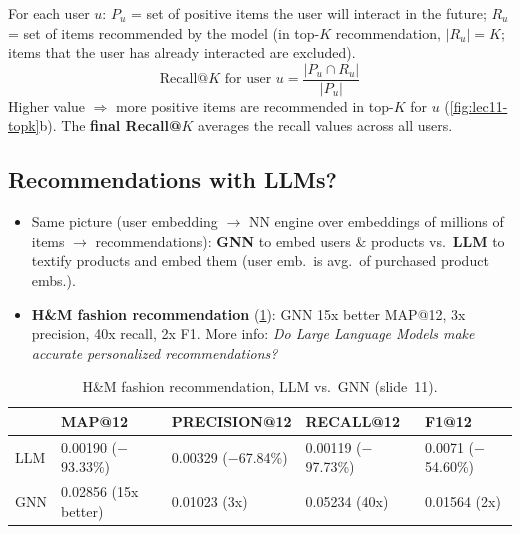 \begin{definition}[Recall@$K$]\label{def:lec11-recall}
  For each user $u$: $P_u$ = set of positive items the user will interact in
  the future; $R_u$ = set of items recommended by the model (in top-$K$
  recommendation, $|R_u|=K$; items that the user has already interacted are
  excluded).
  \begin{equation}\label{eq:lec11-recall}
    \text{Recall@}K\text{ for user }u = \frac{|P_u\cap R_u|}{|P_u|}
  \end{equation}
  Higher value $\Rightarrow$ more positive items are recommended in top-$K$
  for $u$ (\cref{fig:lec11-topk}b). The \textbf{final Recall@$K$} averages the
  recall values across all users.
\end{definition}

\subsection{Recommendations with LLMs?}\label{sec:lec11-llm}

\begin{itemize}
  \item Same picture (user embedding $\to$ NN engine over embeddings of
    millions of items $\to$ recommendations): \textbf{GNN} to embed users \&
    products vs.\ \textbf{LLM} to textify products and embed them (user emb.\
    is avg.\ of purchased product embs.).
  \item \textbf{H\&M fashion recommendation} (\cref{tab:lec11-hm}): GNN 15x
    better MAP@12, 3x precision, 40x recall, 2x F1. More info: \emph{Do Large
    Language Models make accurate personalized recommendations?}
\end{itemize}

\begin{table}[htbp]
  \centering\small
  \caption{H\&M fashion recommendation, LLM vs.\ GNN (slide~11).}
  \label{tab:lec11-hm}
  \begin{tabular}{@{}lllll@{}}
    \toprule
    & MAP@12 & PRECISION@12 & RECALL@12 & F1@12\\
    \midrule
    LLM & 0.00190 ($-$93.33\%) & 0.00329 ($-$67.84\%) & 0.00119 ($-$97.73\%)
        & 0.0071 ($-$54.60\%)\\
    GNN & 0.02856 (15x better) & 0.01023 (3x) & 0.05234 (40x) & 0.01564 (2x)\\
    \bottomrule
  \end{tabular}
\end{table}

